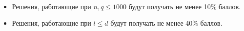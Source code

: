 \begin{itemize}
\item Решения, работающие при $n, q \le 1000$ будут получать не менее 10\% баллов.
\item Решения, работающие при $l \le d$ будут получать не менее 40\% баллов.
\end{itemize}